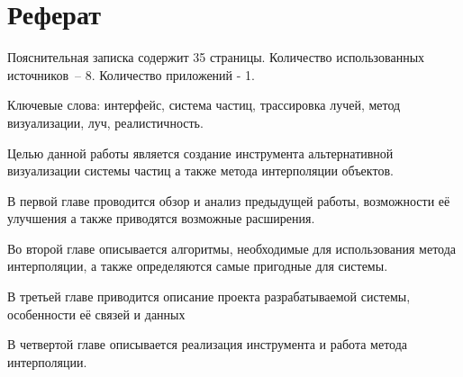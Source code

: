 \chapter*{Реферат}
\thispagestyle{plain}

Пояснительная записка содержит 35  страницы.   Количество использованных источников~-- 8. Количество приложений - 1.

Ключевые слова: интерфейс, система частиц, трассировка лучей, метод визуализации, луч, реалистичность.

Целью данной работы является создание инструмента альтернативной визуализации системы частиц а также метода интерполяции объектов.

В первой главе проводится обзор и анализ предыдущей работы, возможности её улучшения а также приводятся возможные расширения.

Во второй главе описывается алгоритмы, необходимые для использования метода интерполяции, а также определяются самые пригодные для системы.

В третьей главе приводится описание проекта разрабатываемой системы, особенности её связей и данных

В четвертой главе описывается реализация инструмента и работа метода интерполяции.
